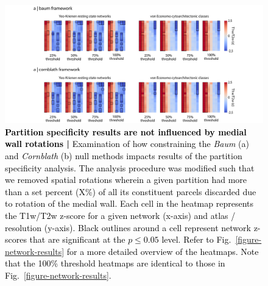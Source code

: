 \documentclass[12pt,aps,pra,reprint,showkeys]{revtex4-1}
\newcommand{\nimg}[1]{\textcolor{black}{{#1}}}
\begin{document}
\begin{figure}[htp]
  \begin{center}
    \centerline{\includegraphics[width=\textwidth]{network_spin_baum_cornblath_results.png}}
    \caption{
      \nimg{\textbf{Partition specificity results are not influenced by medial wall rotations |}
      Examination of how constraining the \textit{Baum} (a) and \textit{Cornblath} (b) null methods impacts results of the partition specificity analysis.
      The analysis procedure was modified such that we removed spatial rotations wherein a given partition had more than a set percent (X\%) of all its constituent parcels discarded due to rotation of the medial wall.
      Each cell in the heatmap represents the T1w/T2w z-score for a given network (x-axis) and atlas / resolution (y-axis).
      Black outlines around a cell represent network z-scores that are significant at the $p \leq 0.05$ level.
      Refer to Fig.~\ref{figure-network-results} for a more detailed overview of the heatmaps.
      Note that the 100\% threshold heatmaps are identical to those in Fig.~\ref{figure-network-results}.}
    }
    \label{supp-figure-baum-cornblath-networks}
  \end{center}
\end{figure}
\end{document}

